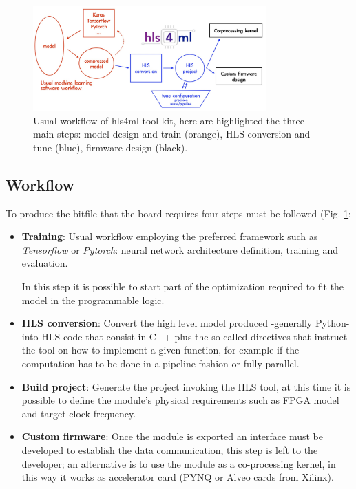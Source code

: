\documentclass[../../main.tex]{subfiles}
\begin{document}
\begin{figure}[h]
    \centering
    \includegraphics[width=0.8\textwidth]{sections/04/Images/hls4ml_workflow.jpg}
    \caption{Usual workflow of hls4ml tool kit, here are highlighted the three main steps: model design and train (orange), HLS conversion and tune (blue), firmware design (black).}
    \label{fig:hls4ml}
\end{figure}

\subsection{Workflow}
\label{sec:FPGA_hls4ml_workflow}

To produce the bitfile that the board requires four steps must be followed (Fig. \ref{fig:hls4ml}:
\begin{itemize}
    \item \textbf{Training}: Usual workflow employing the preferred framework such as \textit{Tensorflow} or \textit{Pytorch}: neural network architecture definition, training and evaluation.  
    
    In this step it is possible to start part of the optimization required to fit the model in the programmable logic.
    \item \textbf{HLS conversion}: Convert the high level model produced -generally Python- into HLS code that consist in C++ plus the so-called directives that instruct the tool on how to implement a given function, for example if the computation has to be done in a pipeline fashion or fully parallel.  
    \item \textbf{Build project}: Generate the project invoking the HLS tool, at this time it is possible to define the module's physical requirements such as FPGA model and target clock frequency.  
    \item \textbf{Custom firmware}: Once the module is exported an interface must be developed to establish the data communication, this step is left to the developer; an alternative is to use the module as a co-processing kernel, in this way it works as accelerator card (PYNQ or Alveo cards from Xilinx).
    
\end{itemize}
\end{document}
